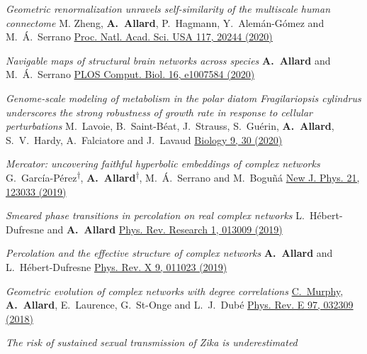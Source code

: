 \documentclass[11pt]{article}
\makeatletter
\newcommand{\reversearabic}[1]{\expandafter\@reversearabic\csname c@#1\endcsname}
\newcommand{\@reversearabic}[1]{%
  \number\numexpr\getrefnumber{this@etaremune@\romannumeral\c@etaremune}-#1+1\relax
}
\newcounter{etaremune}
\newenvironment{etaremune}[1][]{%
  \stepcounter{etaremune}%
  \begin{enumerate}[label=\reversearabic*.,#1]%
}{%
  \edef\@currentlabel{\the\csname c@\@enumctr\endcsname}%
  \label{this@etaremune@\romannumeral\c@etaremune}%
  \end{enumerate}%
}
\makeatother
\begin{document}
\begin{etaremune}[itemsep=0.5em, label={[A\reversearabic*]}]
%
  \item \parbox[t]{\textwidth-30pt}{\textit{Geometric renormalization unravels self-similarity of the multiscale human connectome}\split
  M. Zheng, \textbf{A.~Allard}, P.~Hagmann, Y.~Alem\'an-G\'omez and M.~\'A.~Serrano\split
  \href{http://doi.org/10.1073/pnas.1922248117}{Proc. Natl. Acad. Sci. USA 117, 20244 (2020)}}
%
  \item \parbox[t]{\textwidth-30pt}{\textit{Navigable maps of structural brain networks across species}\split
  \textbf{A.~Allard} and M.~\'A.~Serrano\split
  \href{https://doi.org/10.1371/journal.pcbi.1007584}{PLOS Comput. Biol. 16, e1007584 (2020)}}
  \item \parbox[t]{\textwidth-30pt}{\textit{Genome-scale modeling of metabolism in the polar diatom Fragilariopsis cylindrus underscores the strong robustness of growth rate in response to cellular perturbations}\split
  M.~Lavoie, B.~Saint-Béat, J.~Strauss, S.~Guérin, \textbf{A.~Allard}, S.~V.~Hardy, A.~Falciatore and J.~Lavaud\split
  \href{https://doi.org/10.3390/biology9020030}{Biology 9, 30 (2020)}}
%
  \item \parbox[t]{\textwidth-30pt}{\textit{Mercator: uncovering faithful hyperbolic embeddings of complex networks}\split
  G.~Garc\'ia-P\'erez\textsuperscript{$\dagger$}, \textbf{A.~Allard}\textsuperscript{$\dagger$}, M.~\'A.~Serrano and M.~Bogu\~n\'a\split
  \href{https://doi.org/10.1088/1367-2630/ab57d2}{New J. Phys. 21, 123033 (2019)}}
%
  \item \parbox[t]{\textwidth-30pt}{\textit{Smeared phase transitions in percolation on real complex networks}\split
  L.~H\'ebert-Dufresne and \textbf{A.~Allard}\split
  \href{http://doi.org/10.1103/PhysRevResearch.1.013009}{Phys. Rev. Research 1, 013009 (2019)}}
%
  \item \parbox[t]{\textwidth-30pt}{\textit{Percolation and the effective structure of complex networks}\split
  \textbf{A.~Allard} and L.~H\'ebert-Dufresne\split
  \href{http://doi.org/10.1103/PhysRevX.9.011023}{Phys. Rev. X 9, 011023 (2019)}}
%
  \item \parbox[t]{\textwidth-30pt}{\textit{Geometric evolution of complex networks with degree correlations}\split
  \uline{C.~Murphy}, \textbf{A.~Allard}, E.~Laurence, G.~St-Onge and L.~J.~Dub\'e\split
  \href{http://doi.org/10.1103/PhysRevE.97.032309}{Phys. Rev. E 97, 032309 (2018)}}
%
  \item \parbox[t]{\textwidth-30pt}{\textit{The risk of sustained sexual transmission of Zika is underestimated}\split
}
\end{etaremune}
\end{document}
